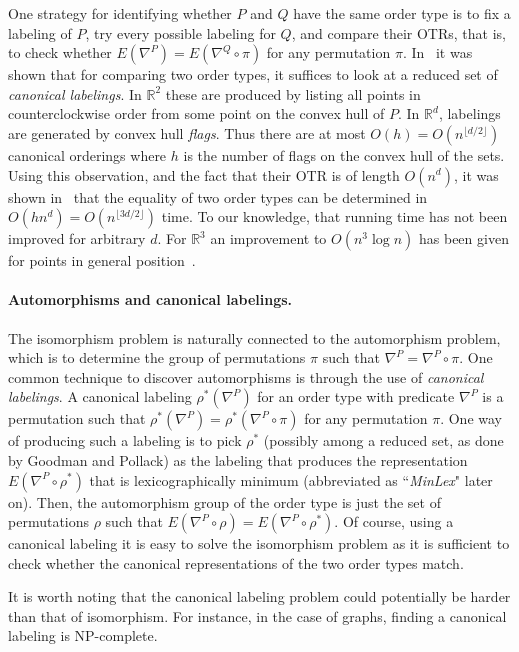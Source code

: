 \documentclass[leqno,12pt]{article}
\def\R{\mathbb{R}}
\begin{document}
One strategy for identifying whether $P$ and $Q$  have the same order
type is  to fix a labeling of $P$, try every possible
labeling for $Q$, and compare their OTRs, that is, to check whether 
$E(\nabla^P)=E(\nabla^Q\circ\pi)$ for any permutation $\pi$.
In~\cite{goodman_pollack_83_sorting} 
it was shown
 that for comparing two order
types, it suffices to look at a reduced set of \emph{canonical
  labelings}. In $\R^2$ these are produced by listing all points in
counterclockwise order from some point on the convex hull of $P$. 
In $\R^d$, labelings are generated by convex hull \emph{flags}.
Thus there are at most $O(h) = O(n^{\lfloor d/2 \rfloor})$ canonical orderings where
$h$ is the number of flags  on the convex hull of the sets. 
Using this observation, and the fact that their OTR is of length $O(n^d)$, it was shown
in~\cite{goodman_pollack_83_sorting} that the equality of two order types can be determined in $O(hn^d)
= O(n^{\lfloor 3d/2 \rfloor})$ time.
To our
knowledge, that running time has not been improved for arbitrary $d$.
For $\R^3$ an improvement to $O(n^3\log n)$ has been given for points in general position~\cite{ordertypes_EuroCG12}.\\


\paragraph{Automorphisms and canonical labelings.}
The isomorphism problem is naturally connected to the automorphism
problem, which is to determine the group of permutations $\pi$ such
that  $\nabla^P = \nabla^P\circ\pi$.
One common technique to discover automorphisms is through the use of
\emph{canonical labelings}.
A canonical labeling $\rho^*(\nabla^P)$ for an order type with predicate
$\nabla^P$ is a permutation such that 
$\rho^*(\nabla^P) = \rho^*(\nabla^P\circ\pi)$ for any permutation
$\pi$.
One way of producing such a labeling is to pick $\rho^*$  
(possibly among a reduced set, as done by Goodman and Pollack) as the
labeling that produces the representation $E(\nabla^P\circ\rho^*)$
that is lexicographically minimum (abbreviated as ``{\em MinLex}" later on).
Then, the automorphism group of the order type is just the set of
permutations $\rho$ such that $E(\nabla^P\circ\rho)=E(\nabla^P\circ\rho^*)$.
Of course, using a canonical labeling it is easy to solve the
isomorphism problem as it is sufficient to check whether the canonical
representations of the two order types match.

It is worth noting that the canonical labeling problem could potentially be
 harder than that of isomorphism. For instance, in the case of graphs,  finding a canonical labeling is NP-complete.\\
\end{document}

